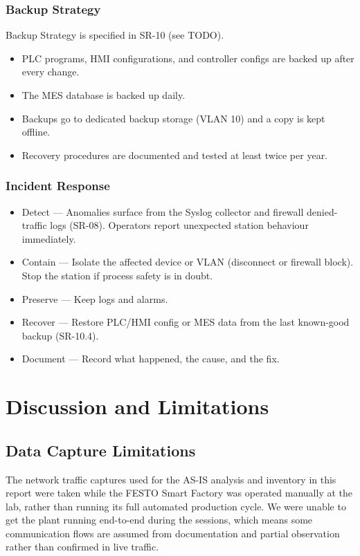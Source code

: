 \documentclass[11pt,a4paper]{article}
\begin{document}
\subsubsection{Backup Strategy}
Backup Strategy is specified in SR-10 (see TODO).

\begin{itemize}
    \item PLC programs, HMI configurations, and controller configs are backed up after every change.
    \item The MES database is backed up daily.
    \item Backups go to dedicated backup storage (VLAN 10) and a copy is kept offline.
    \item Recovery procedures are documented and tested at least twice per year.
\end{itemize}

\subsubsection{Incident Response}
\begin{itemize}
    \item Detect — Anomalies surface from the Syslog collector and firewall denied-traffic logs (SR-08). Operators report unexpected station behaviour immediately.
    \item Contain — Isolate the affected device or VLAN (disconnect or firewall block). Stop the station if process safety is in doubt.
    \item Preserve — Keep logs and alarms.
    \item Recover — Restore PLC/HMI config or MES data from the last known-good backup (SR-10.4).
    \item Document — Record what happened, the cause, and the fix. 
\end{itemize}

\section{Discussion and Limitations}
\subsection{Data Capture Limitations}

The network traffic captures used for the AS-IS analysis and inventory in this
report were taken while the FESTO Smart Factory was operated manually at the
lab, rather than running its full automated production cycle. We were unable to
get the plant running end-to-end during the sessions, which means some
communication flows are assumed from documentation and partial observation
rather than confirmed in live traffic.
\end{document}
